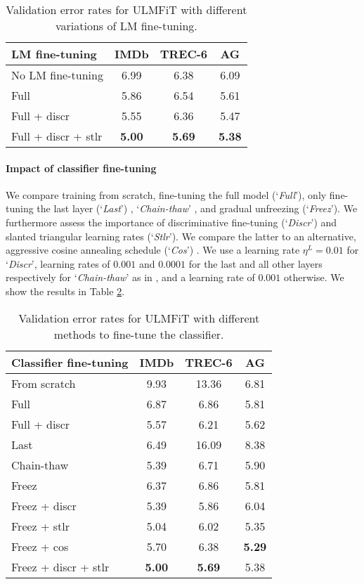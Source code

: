 \documentclass[11pt,a4paper]{article}
\begin{document}
\begin{table}
\centering
\begin{tabular}{l c c c}
\toprule
LM fine-tuning & IMDb & TREC-6 & AG\\
 \midrule
No LM fine-tuning & 6.99 & 6.38 & 6.09\\
Full & 5.86 & 6.54 & 5.61 \\
Full + discr & 5.55 & 6.36 & 5.47\\
Full + discr + stlr & \textbf{5.00} & \textbf{5.69} & \textbf{5.38} \\
\bottomrule
\end{tabular}
\caption{Validation error rates for ULMFiT with different variations of LM fine-tuning.}
\label{tab:lm-fine-tuning}
\end{table}

\paragraph{Impact of classifier fine-tuning} We compare training from scratch, fine-tuning the full model (`\emph{Full}'), only fine-tuning the last layer (`\emph{Last}') \cite{donahue2014decaf}, `\emph{Chain-thaw}' \cite{Felbo2017}, and gradual unfreezing (`\emph{Freez}'). We furthermore assess the importance of discriminative fine-tuning (`\emph{Discr}') and slanted triangular learning rates (`\emph{Stlr}'). We compare the latter to an alternative, aggressive cosine annealing schedule (`\emph{Cos}') \cite{Loshchilov2017}. We use a learning rate $\eta^L=0.01$ for `\emph{Discr}', learning rates of $0.001$ and $0.0001$ for the last and all other layers respectively for `\emph{Chain-thaw}' as in \cite{Felbo2017}, and a learning rate of $0.001$ otherwise. We show the results in Table \ref{tab:target-task-fine-tuning}. 

\begin{table}
\centering
\begin{tabular}{l c c c}
\toprule
Classifier fine-tuning & IMDb & TREC-6 & AG \\
 \midrule
From scratch & 9.93 & 13.36 & 6.81 \\
Full & 6.87 & 6.86 & 5.81 \\
Full + discr & 5.57 & 6.21 & 5.62\\
Last & 6.49 & 16.09 & 8.38 \\
Chain-thaw & 5.39 & 6.71 & 5.90\\
Freez & 6.37 & 6.86 & 5.81 \\
Freez + discr & 5.39 & 5.86 & 6.04 \\
Freez + stlr & 5.04 & 6.02 & 5.35 \\
Freez + cos & 5.70 & 6.38 & \textbf{5.29} \\
Freez + discr + stlr & \textbf{5.00} & \textbf{5.69} & 5.38 \\
\bottomrule
\end{tabular}
\caption{Validation error rates for ULMFiT with different methods to fine-tune the classifier.}
\label{tab:target-task-fine-tuning}
\end{table}
\end{document}
